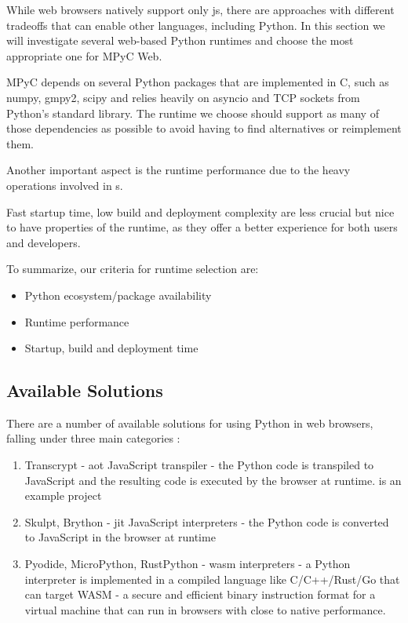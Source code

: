 While web browsers natively support only \gls{js}, there are approaches with different tradeoffs that can enable other languages, including Python. In this section we will investigate several web-based Python runtimes and choose the most appropriate one for MPyC Web.

MPyC depends on several Python packages that are implemented in C, such as numpy, gmpy2, scipy and relies heavily on asyncio and TCP sockets from Python's standard library. The runtime we choose should support as many of those dependencies as possible to avoid having to find alternatives or reimplement them.

Another important aspect is the runtime performance due to the heavy operations involved in s.

Fast startup time, low build and deployment complexity are less crucial but nice to have properties of the runtime, as they offer a better experience for both users and developers.

To summarize, our criteria for runtime selection are:

\begin{itemize}
\tightlist
\item
  Python ecosystem/package availability
\item
  Runtime performance
\item
  Startup, build and deployment time
\end{itemize}

\subsection{Available Solutions}\label{thesis__090-mpyc-web.md__available-solutions}

There are a number of available solutions for using Python in web browsers, falling under three main categories\autocite{pyodideIntroMozilla} \autocite{anvilPythonBrowser}:

\begin{enumerate}
\def\labelenumi{\arabic{enumi}.}
\tightlist
\item
  Transcrypt\autocite{transcryptRepo} - \gls{aot} JavaScript transpiler - the Python code is transpiled to JavaScript and the resulting code is executed by the browser at runtime. is an example project
\item
  Skulpt\autocite{skulptDocs}, Brython\autocite{brythonDocs} - \gls{jit} JavaScript interpreters - the Python code is converted to JavaScript in the browser at runtime
\item
  Pyodide\autocite{pyodideDocs}, MicroPython\autocite{microPythonDocs}, RustPython\autocite{rustPythonDocs} - \gls{wasm}\autocite{wasmDocs} interpreters - a Python interpreter is implemented in a compiled language like C/C++/Rust/Go that can target WASM - a secure and efficient binary instruction format for a virtual machine that can run in browsers with close to native performance.
\end{enumerate}

